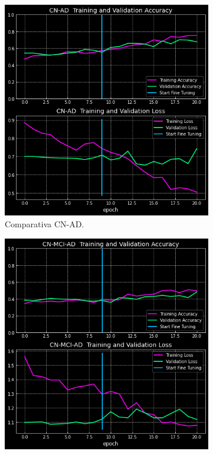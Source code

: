 \begin{figure}[H]
    \centering
    \begin{subfigure}{0.4\textwidth}
        \includegraphics[width=\textwidth]{./imgs/resultados/axial/CN_AD_output_AXIAL}
        \caption{Comparativa CN-AD. }
        \label{fig:axial-cn-ad}
    \end{subfigure}
    \hspace*{\fill}
    \begin{subfigure}{0.4\textwidth}
        \includegraphics[width=\textwidth]{./imgs/resultados/axial/CN_MCI_AD_output_AXIAL}

\end{subfigure}
\end{figure}
